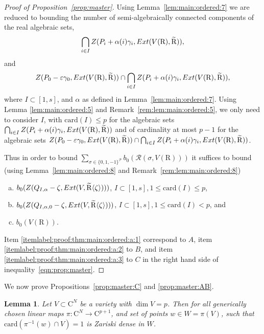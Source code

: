 \documentclass[10pt]{amsart}
\newtheorem{lemma}{Lemma}[section]
\theoremstyle{definition}
\theoremstyle{remark}
\numberwithin{equation}{section}
\newcommand {\R} {\mathrm{R}}
\newcommand {\C}     {\mathrm{C}}
\newcommand {\ZZ} {{\rm Z}}
\newcommand {\RR} {{\mathcal R}}
\newcommand {\la}   {{\langle}}
\newcommand {\ra}   {{\rangle}}
\newcommand {\eps} {{\varepsilon}}
\newcommand {\E} {{\rm Ext}}
\newcommand{\card}{\mathrm{card}}
\begin{document}
\begin{proof}[Proof of Proposition~\ref{prop:master}]
 Using Lemma~\ref{lem:main:ordered:7} we are reduced to bounding the number of semi-algebraically connected components of the real algebraic sets,
    \[
    \bigcap_{i\in I}
    \ZZ(P_i + \alpha(i)\gamma_i,\E(V(\R),\widetilde{\R})),
    \]
    and 
    \[
    \ZZ(P_0 - \eps \gamma_0,\E(V(\R),\widetilde{\R}))  \cap  \bigcap_{i\in I} \ZZ(P_i + \alpha(i)\gamma_i,\E(V(\R),\widetilde{\R})),
    \]
    where $I \subset [1,s]$, and $\alpha$ as defined in Lemma~\ref{lem:main:ordered:7}.
    Using Lemma
    \ref{lem:main:ordered:5} and Remark~\ref{rem:lem:main:ordered:5},
    we only need to consider $I$, with $\card(I) \leq p$
    for the algebraic sets
    $\bigcap_{i\in I}
    \ZZ(P_i + \alpha(i)\gamma_i,\E(V(\R),\widetilde{\R}))$
    and of cardinality at most $p-1$ for the algebraic sets
    $\ZZ(P_0 - \eps \gamma_0,\E(V(\R),\widetilde{\R}))  \cap  \bigcap_{i\in I} \ZZ(P_i + \alpha(i)\gamma_i,\E(V(\R),\widetilde{\R}))$.
    
    

Thus in order to bound 
$\sum_{\sigma \in \{0,1,-1\}^{\mathcal{P}}} b_0(\RR(\sigma,V(\R)))$ it suffices to bound (using Lemma~\ref{lem:main:ordered:8} and Remark~\ref{rem:lem:main:ordered:8})
\begin{enumerate}[(a)]
\item 
\label{itemlabel:proof:thm:main:ordered:a:1}
$b_0(\ZZ(Q_{I,\alpha} - \zeta, \E(V,\widetilde{\R}\la\zeta\ra)))$,
$I \subset [1,s], 1 \leq \card(I) \leq p$,
\item 
\label{itemlabel:proof:thm:main:ordered:a:2}
 $b_0(\ZZ(Q_{I,\alpha,0} - \zeta, \E(V,\widetilde{\R}\la\zeta\ra)))$,
$I \subset [1,s], 1 \leq \card(I) < p$,
and
\item 
\label{itemlabel:proof:thm:main:ordered:a:3}
$b_0(V(\R))$.
\end{enumerate}

Item \eqref{itemlabel:proof:thm:main:ordered:a:1} correspond to 
$A$,
item \eqref{itemlabel:proof:thm:main:ordered:a:2} to 
$B$, and 
item \eqref{itemlabel:proof:thm:main:ordered:a:3} to
$C$ in the right hand side of 
inequality~\eqref{eqn:prop:master}.
\end{proof}

We now prove Propositions~\ref{prop:master:C} and \ref{prop:master:AB}.


 

\begin{lemma}
\label{lem:main:ordered:0}
    Let $V \subset \C^N$ be a variety  with $\dim V = p$.
    Then for all generically chosen linear maps $\pi:\C^N \rightarrow \C^{p+1}$,
    and set of points $w \in W = \pi(V)$, such that
    $\card(\pi^{-1}(w) \cap V)=1$ is Zariski dense in $W$.
\end{lemma}
\end{document}
